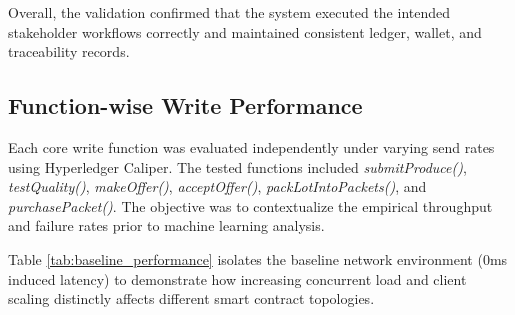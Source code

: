 \documentclass[manuscript,screen]{acmart}
\begin{document}
	
Overall, the validation confirmed that the system executed the intended stakeholder workflows correctly and maintained consistent ledger, wallet, and traceability records.
	
	
	
	
	

\subsection{Function-wise Write Performance}

Each core write function was evaluated independently under varying send rates using Hyperledger Caliper. The tested functions included \textit{submitProduce()}, \textit{testQuality()}, \textit{makeOffer()}, \textit{acceptOffer()}, \textit{packLotIntoPackets()}, and \textit{purchasePacket()}. The objective was to contextualize the empirical throughput and failure rates prior to machine learning analysis.

Table \ref{tab:baseline_performance} isolates the baseline network environment (0ms induced latency) to demonstrate how increasing concurrent load and client scaling distinctly affects different smart contract topologies. 
\end{document}
